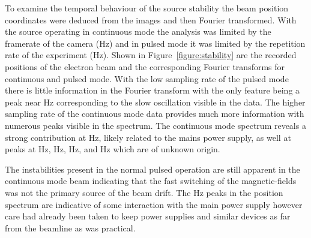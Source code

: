 To examine the temporal behaviour of the source stability the beam position coordinates were deduced from the images and then Fourier transformed.
With the source operating in continuous mode the analysis was limited by the framerate of the camera (\unit[240]{Hz}) and in pulsed mode it was limited by the repetition rate of the experiment (\unit[10]{Hz}).
Shown in Figure~\ref{figure:stability} are the recorded positions of the electron beam and the corresponding Fourier transforms for continuous and pulsed mode.
With the low sampling rate of the pulsed mode there is little information in the Fourier transform with the only feature being a peak near \unit[0]{Hz} corresponding to the slow oscillation visible in the data.
The higher sampling rate of the continuous mode data provides much more information with numerous peaks visible in the spectrum.
The continuous mode spectrum reveals a strong contribution at \unit[50]{Hz}, likely related to the mains power supply, as well at peaks at \unit[45]{Hz}, \unit[67]{Hz}, \unit[84]{Hz}, and \unit[92]{Hz} which are of unknown origin.

The instabilities present in the normal pulsed operation are still apparent in the continuous mode beam indicating that the fast switching of the magnetic-fields was not the primary source of the beam drift.
The \unit[50]{Hz} peaks in the position spectrum are indicative of some interaction with the main power supply however care had already been taken to keep power supplies and similar devices as far from the beamline as was practical.

